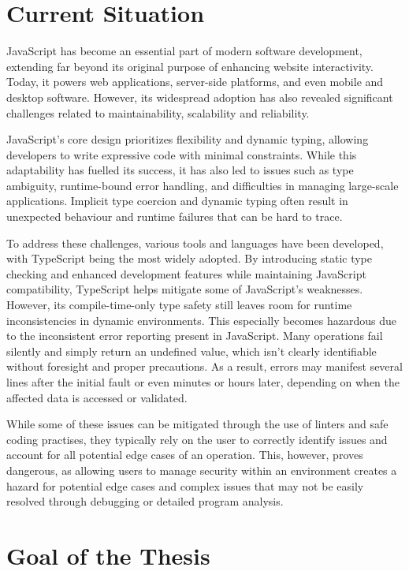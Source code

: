 \section{Current Situation}

JavaScript has become an essential part of modern software development, extending far beyond its original purpose of enhancing website interactivity. Today, it powers web applications, server-side platforms, and even mobile and desktop software. However, its widespread adoption has also revealed significant challenges related to maintainability, scalability and reliability. 

JavaScript’s core design prioritizes flexibility and dynamic typing, allowing developers to write expressive code with minimal constraints. While this adaptability has fuelled its success, it has also led to issues such as type ambiguity, runtime-bound error handling, and difficulties in managing large-scale applications. Implicit type coercion and dynamic typing often result in unexpected behaviour and runtime failures that can be hard to trace. 

To address these challenges, various tools and languages have been developed, with TypeScript being the most widely adopted. By introducing static type checking and enhanced development features while maintaining JavaScript compatibility, TypeScript helps mitigate some of JavaScript’s weaknesses. However, its compile-time-only type safety still leaves room for runtime inconsistencies in dynamic environments. This especially becomes hazardous due to the inconsistent error reporting present in JavaScript. Many operations fail silently and simply return an undefined value, which isn't clearly identifiable without foresight and proper precautions. As a result, errors may manifest several lines after the initial fault or even minutes or hours later, depending on when the affected data is accessed or validated.

While some of these issues can be mitigated through the use of linters and safe coding practises, they typically rely on the user to correctly identify issues and account for all potential edge cases of an operation. This, however, proves dangerous, as allowing users to manage security within an environment creates a hazard for potential edge cases and complex issues that may not be easily resolved through debugging or detailed program analysis.

\section{Goal of the Thesis}

